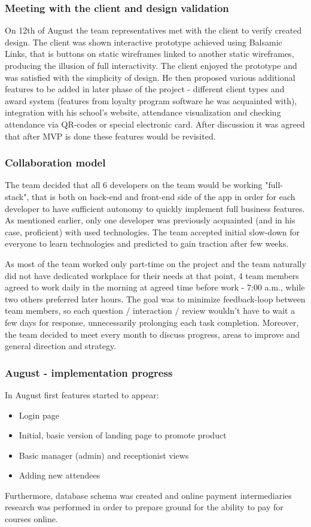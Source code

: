 \documentclass{article}
\begin{document}
\subsubsection{Meeting with the client and design validation}
On 12th of August the team representatives met with the client to verify created design. The client was shown interactive prototype achieved using Balsamic Links, that is buttons on static wireframes linked to another static wireframes, producing the illusion of full interactivity. The client enjoyed the prototype and was satisfied with the simplicity of design. He then proposed various additional features to be added in later phase of the project - different client types and award system (features from loyalty program software he was acquainted with), integration with his school's website, attendance visualization and checking attendance via QR-codes or special electronic card. After discussion it was agreed that after MVP is done these features would be revisited.

\subsubsection{Collaboration model}
The team decided that all 6 developers on the team would be working "full-stack", that is both on back-end and front-end side of the app in order for each developer to have sufficient autonomy to quickly implement full business features. As mentioned earlier, only one developer was previously acquainted (and in his case, proficient) with used technologies. The team accepted initial slow-down for everyone to learn technologies and predicted to gain traction after few weeks.

As most of the team worked only part-time on the project and the team naturally did not have dedicated workplace for their needs at that point, 4 team members agreed to work daily in the morning at agreed time before work - 7:00 a.m., while two others preferred later hours. The goal was to minimize feedback-loop between team members, so each question / interaction / review wouldn't have to wait a few days for response, unnecessarily prolonging each task completion. Moreover, the team decided to meet every month to discuss progress, areas to improve and general direction and strategy.

\subsubsection{August - implementation progress}
In August first features started to appear:
\begin{itemize}
\item Login page
\item Initial, basic version of landing page to promote product
\item Basic manager (admin) and receptionist views
\item Adding new attendees
\end{itemize}
Furthermore, database schema was created and online payment intermediaries research was performed in order to prepare ground for the ability to pay for courses online.
\end{document}

